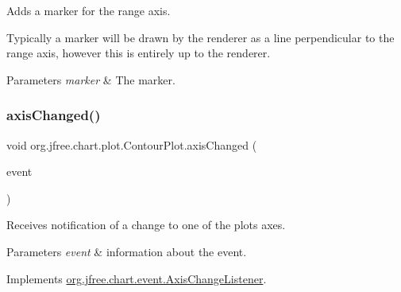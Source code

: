 Adds a marker for the range axis. 

Typically a marker will be drawn by the renderer as a line perpendicular to the range axis, however this is entirely up to the renderer.


\begin{DoxyParams}{Parameters}
{\em marker} & The marker. \\
\hline
\end{DoxyParams}
\mbox{\label{classorg_1_1jfree_1_1chart_1_1plot_1_1_contour_plot_a59029d9c4f1fa0ecbd4d201ab0f01189}} 
\subsubsection{\texorpdfstring{axis\+Changed()}{axisChanged()}}
{\footnotesize\ttfamily void org.\+jfree.\+chart.\+plot.\+Contour\+Plot.\+axis\+Changed (\begin{DoxyParamCaption}\item[{\mbox{\hyperlink{classorg_1_1jfree_1_1chart_1_1event_1_1_axis_change_event}{Axis\+Change\+Event}}}]{event }\end{DoxyParamCaption})}

Receives notification of a change to one of the plot\textquotesingle{}s axes.


\begin{DoxyParams}{Parameters}
{\em event} & information about the event. \\
\hline
\end{DoxyParams}


Implements \mbox{\hyperlink{interfaceorg_1_1jfree_1_1chart_1_1event_1_1_axis_change_listener_a0598d6b49c0ec1aff38fe39d34297b87}{org.\+jfree.\+chart.\+event.\+Axis\+Change\+Listener}}.

\mbox{\label{classorg_1_1jfree_1_1chart_1_1plot_1_1_contour_plot_aaf083bfe4999467fac767f9232c03f60}} 
